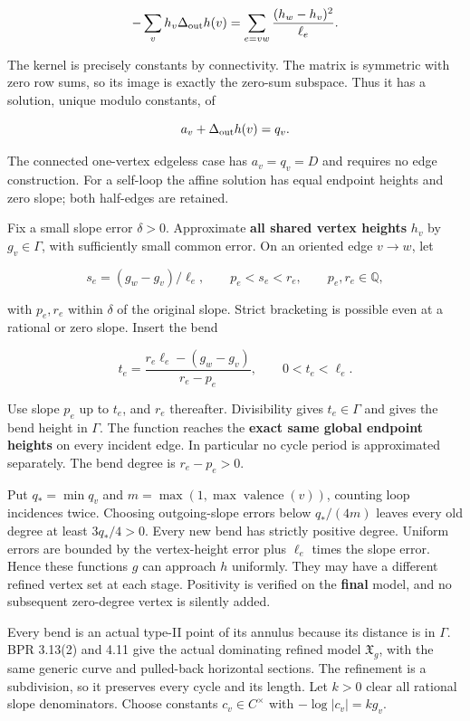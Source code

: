 \documentclass[
  11pt,
]{article}
\begin{document}
\[
 -\sum_vh_v\Delta_{\rm out}h(v)
     =\sum_{e=vw}\frac{(h_w-h_v)^2}{\ell_e}.
\]

The kernel is precisely constants by connectivity. The matrix is
symmetric with zero row sums, so its image is exactly the zero-sum
subspace. Thus it has a solution, unique modulo constants, of

\[
 a_v+\Delta_{\rm out}h(v)=q_v.
\]

The connected one-vertex edgeless case has \(a_v=q_v=D\) and requires no
edge construction. For a self-loop the affine solution has equal
endpoint heights and zero slope; both half-edges are retained.

Fix a small slope error \(\delta>0\). Approximate \textbf{all shared
vertex heights} \(h_v\) by \(g_v\in\Gamma\), with sufficiently small
common error. On an oriented edge \(v\to w\), let

\[
 s_e=(g_w-g_v)/\ell_e,\qquad
 p_e<s_e<r_e,
 \qquad p_e,r_e\in\mathbb Q,
\]

with \(p_e,r_e\) within \(\delta\) of the original slope. Strict
bracketing is possible even at a rational or zero slope. Insert the bend

\[
 t_e=\frac{r_e\ell_e-(g_w-g_v)}{r_e-p_e},\qquad 0<t_e<\ell_e.
\]

Use slope \(p_e\) up to \(t_e\), and \(r_e\) thereafter. Divisibility
gives \(t_e\in\Gamma\) and gives the bend height in \(\Gamma\). The
function reaches the \textbf{exact same global endpoint heights} on
every incident edge. In particular no cycle period is approximated
separately. The bend degree is \(r_e-p_e>0\).

Put \(q_*=\min q_v\) and \(m=\max(1,\max\operatorname{valence}(v))\),
counting loop incidences twice. Choosing outgoing-slope errors below
\(q_*/(4m)\) leaves every old degree at least \(3q_*/4>0\). Every new
bend has strictly positive degree. Uniform errors are bounded by the
vertex-height error plus \(\ell_e\) times the slope error. Hence these
functions \(g\) can approach \(h\) uniformly. They may have a different
refined vertex set at each stage. Positivity is verified on the
\textbf{final} model, and no subsequent zero-degree vertex is silently
added.

Every bend is an actual type-II point of its annulus because its
distance is in \(\Gamma\). BPR 3.13(2) and 4.11 give the actual
dominating refined model \(\mathfrak X_g\), with the same generic curve
and pulled-back horizontal sections. The refinement is a subdivision, so
it preserves every cycle and its length. Let \(k>0\) clear all rational
slope denominators. Choose constants \(c_v\in C^\times\) with
\(-\log|c_v|=kg_v\).
\end{document}

